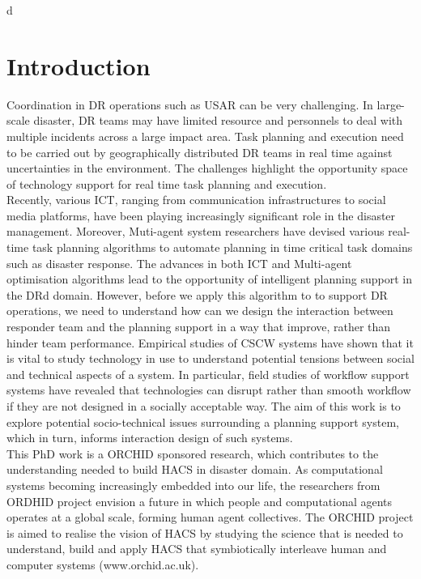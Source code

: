 d\chapter{Introduction}\label{ch:introduction}
Coordination in \acf{DR} operations such as \acf{USAR} can be very challenging. In large-scale disaster, DR teams may have limited resource and personnels to deal with multiple incidents across a large impact area. Task planning and execution need to be carried out by geographically distributed DR teams in real time against uncertainties in the environment. The challenges highlight the opportunity space of technology support for real time task planning and execution.  \\ 

Recently, various \acf{ICT}, ranging from communication infrastructures to social media platforms, have been playing increasingly significant role in the disaster management.  Moreover, Muti-agent system researchers have devised various real-time task planning algorithms to automate planning in time critical task domains such as disaster response. The advances in both \ac{ICT} and Multi-agent optimisation algorithms lead to the opportunity of intelligent planning support in the \ac{DR}d domain. However, before we apply this algorithm to to support \ac{DR} operations, we need to understand how can we design the interaction between responder team and the planning support in a way that improve, rather than hinder team performance. Empirical studies of \acf{CSCW} systems have shown that it is vital to study technology in use to understand potential tensions between social and technical aspects of a system. In particular, field studies of workflow support systems have revealed that technologies can disrupt rather than smooth workflow if they are not designed in a socially acceptable way. The aim of this work is to explore potential socio-technical issues surrounding a planning support system, which in turn, informs interaction design of such systems. \\

This PhD work is a ORCHID sponsored research, which contributes to the understanding needed to build \acf{HACS} in disaster domain. As computational systems  becoming increasingly embedded into our life, the researchers from ORDHID project envision a future in which people and computational agents operates at a global scale, forming human agent collectives. The ORCHID project is aimed to realise the vision of \ac{HACS} by studying the science that is needed to understand, build and apply \ac{HACS} that symbiotically interleave human and computer systems (www.orchid.ac.uk).\\

